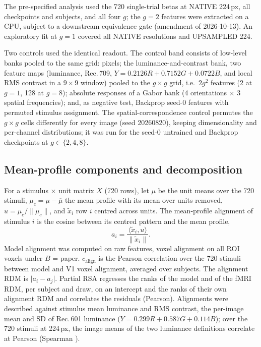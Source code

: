 \documentclass[10pt]{article}
\begin{document}
The pre-specified analysis used the 720 single-trial betas at NATIVE 224\,px, all
checkpoints and subjects, and all four $g$; the $g = 2$ features were extracted on a CPU,
subject to a downstream equivalence gate (amendment of 2026-10-13). An exploratory fit
at $g = 1$ covered all NATIVE resolutions and UPSAMPLED 224.

Two controls used the identical readout. The control band consists of low-level banks
pooled to the same grid: pixels; the luminance-and-contrast bank, two feature maps (luminance, Rec.\,709, $Y = 0.2126R + 0.7152G + 0.0722B$, and local RMS contrast in a $9 \times 9$ window) pooled to the $g \times g$ grid, i.e.\ $2g^2$ features (2 at $g = 1$, 128 at $g = 8$); absolute responses of a Gabor bank (4 orientations $\times$
3 spatial frequencies); and, as negative test, Backprop seed-0 features with permuted
stimulus assignment. The spatial-correspondence control permutes the $g \times g$ cells
differently for every image (seed 20260820), keeping dimensionality and per-channel
distributions; it was run for the seed-0 untrained and Backprop checkpoints at
$g \in \{2, 4, 8\}$.

\subsection{Mean-profile components and decomposition}
\label{sec:gainmethods}

For a stimulus $\times$ unit matrix $X$ (720 rows), let $\mu$ be the unit means over the 720
stimuli, $\mu_c = \mu - \overline{\mu}$ the mean profile with its mean over units removed,
$u = \mu_c / \lVert \mu_c \rVert$, and $\tilde{x}_i$ row $i$ centred across units. The
mean-profile alignment of stimulus $i$ is the cosine between its centred pattern and the
mean profile,
\begin{equation}
  a_i = \frac{\langle \tilde{x}_i, u \rangle}{\lVert \tilde{x}_i \rVert}.
\end{equation}
Model alignment was computed on raw features, voxel alignment on all ROI voxels under
$B$ = paper. $c_{\mathrm{align}}$ is the Pearson correlation over the 720 stimuli between
model and V1 voxel alignment, averaged over subjects. The alignment RDM is
$\lvert a_i - a_j \rvert$. Partial RSA regresses the ranks of the model and of the fMRI
RDM, per subject and draw, on an intercept and the ranks of their own alignment RDM and
correlates the residuals (Pearson). Alignments were described against stimulus mean
luminance and RMS contrast, the per-image mean and SD of Rec.\,601 luminance
($Y = 0.299R + 0.587G + 0.114B$); over the 720 stimuli at 224\,px, the image means of the
two luminance definitions correlate at Pearson \LumDefPearson{} (Spearman
\LumDefSpearman).
\end{document}
